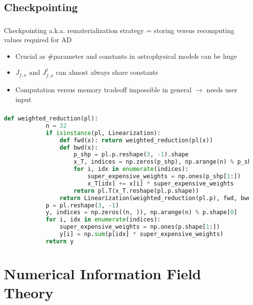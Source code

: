 \documentclass[aspectratio=169,xcolor=dvipsnames]{beamer}
\begin{document}
\subsection{Checkpointing}
\begin{frame}
	\frametitle{\insertsection}
	\framesubtitle{\insertsubsection}

	Checkpointing a.k.a. rematerialization strategy = storing versus recomputing values required for AD

	\begin{itemize}
		\item Crucial as \#parameter and constants in astrophysical models can be huge
		\item $J_{f,x}$ and $J_{f,x}^\dagger$ can almost always share constants
		\item Computation versus memory tradeoff impossible in general $\rightarrow$ needs user input
	\end{itemize}

\end{frame}

\begin{frame}[fragile]
	\frametitle{\insertsection}
	\framesubtitle{\insertsubsection}

	\vspace{-1em}
	\begin{lstlisting}[language=python,escapechar=!]
		def weighted_reduction(pl):
			n = 32
			if isinstance(pl, Linearization):
				def fwd(x): return weighted_reduction(pl(x))
				def bwd(x):
					p_shp = pl.p.reshape(3, -1).shape
					x_T, indices = np.zeros(p_shp), np.arange(n) % p_shp[0]
					for i, idx in enumerate(indices):
						super_expensive_weights = np.ones(p_shp[1:])
						x_T[idx] += x[i] * super_expensive_weights
					return pl.T(x_T.reshape(pl.p.shape))
				return Linearization(weighted_reduction(pl.p), fwd, bwd)
			p = pl.reshape(3, -1)
			y, indices = np.zeros((n, )), np.arange(n) % p.shape[0]
			for i, idx in enumerate(indices):
				super_expensive_weights = np.ones(p.shape[1:])
				y[i] = np.sum(p[idx] * super_expensive_weights)
			return y
	\end{lstlisting}
\end{frame}

\section{Numerical Information Field Theory}  %
\end{document}
